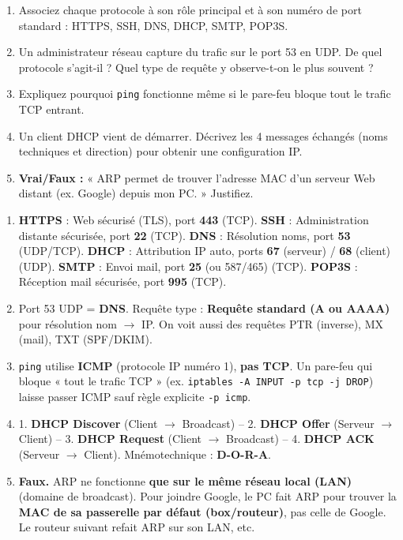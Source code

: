 \documentclass[11pt]{article}
\begin{document}
\begin{exercice}
\begin{enumerate}
    \item Associez chaque protocole à son rôle principal et à son numéro de port standard : HTTPS, SSH, DNS, DHCP, SMTP, POP3S.
    \item Un administrateur réseau capture du trafic sur le port 53 en UDP. De quel protocole s'agit-il ? Quel type de requête y observe-t-on le plus souvent ?
    \item Expliquez pourquoi \texttt{ping} fonctionne même si le pare-feu bloque tout le trafic TCP entrant.
    \item Un client DHCP vient de démarrer. Décrivez les 4 messages échangés (noms techniques et direction) pour obtenir une configuration IP.
    \item \textbf{Vrai/Faux :} « ARP permet de trouver l'adresse MAC d'un serveur Web distant (ex. Google) depuis mon PC. » Justifiez.
\end{enumerate}
\end{exercice}

\begin{corrige}
\begin{enumerate}
    \item \textbf{HTTPS} : Web sécurisé (TLS), port \textbf{443} (TCP). \textbf{SSH} : Administration distante sécurisée, port \textbf{22} (TCP). \textbf{DNS} : Résolution noms, port \textbf{53} (UDP/TCP). \textbf{DHCP} : Attribution IP auto, ports \textbf{67} (serveur) / \textbf{68} (client) (UDP). \textbf{SMTP} : Envoi mail, port \textbf{25} (ou 587/465) (TCP). \textbf{POP3S} : Réception mail sécurisée, port \textbf{995} (TCP).
    \item Port 53 UDP = \textbf{DNS}. Requête type : \textbf{Requête standard (A ou AAAA)} pour résolution nom $\to$ IP. On voit aussi des requêtes PTR (inverse), MX (mail), TXT (SPF/DKIM).
    \item \texttt{ping} utilise \textbf{ICMP} (protocole IP numéro 1), \textbf{pas TCP}. Un pare-feu qui bloque « tout le trafic TCP » (ex. \texttt{iptables -A INPUT -p tcp -j DROP}) laisse passer ICMP sauf règle explicite \texttt{-p icmp}.
    \item 1. \textbf{DHCP Discover} (Client $\to$ Broadcast) -- 2. \textbf{DHCP Offer} (Serveur $\to$ Client) -- 3. \textbf{DHCP Request} (Client $\to$ Broadcast) -- 4. \textbf{DHCP ACK} (Serveur $\to$ Client). Mnémotechnique : \textbf{D-O-R-A}.
    \item \textbf{Faux.} ARP ne fonctionne \textbf{que sur le même réseau local (LAN)} (domaine de broadcast). Pour joindre Google, le PC fait ARP pour trouver la \textbf{MAC de sa passerelle par défaut (box/routeur)}, pas celle de Google. Le routeur suivant refait ARP sur son LAN, etc.
\end{enumerate}
\end{corrige}
\end{document}
